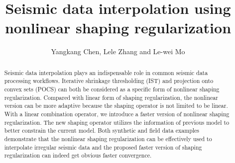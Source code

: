\title{Seismic data interpolation using nonlinear shaping regularization}

\renewcommand{\thefootnote}{\fnsymbol{footnote}}
\author{Yangkang Chen\footnotemark[1], Lele Zhang \footnotemark[2] and Le-wei Mo \footnotemark[3]}

\address{
\footnotemark[1]Bureau of Economic Geology \\
John A. and Katherine G. Jackson School of Geosciences \\
The University of Texas at Austin \\
University Station, Box X \\
Austin, TX 78713-8924 \\

\footnotemark[2]
Institute of Geology and Geophysics, \\
Chinese Academy of Sciences,\\
Beijing, China, 102200 \\

\footnotemark[3]Research and Development Technology Group,
Fairfield Nodal, \\
1111 Gillingham Lane, \\
Sugar Land, TX 77478 \\
}


\maketitle

\begin{abstract}
Seismic data interpolation plays an indispensable role in common seismic data processing workflows. Iterative shrinkage thresholding (IST) and projection onto convex sets (POCS) can both be considered as a specific form of nonlinear shaping regularization. Compared with linear form of shaping regularization, the nonlinear version can be more adaptive because the shaping operator is not limited to be linear. With a linear combination operator, we introduce a faster version of nonlinear shaping regularization. The new shaping operator utilizes the information of previous model to better constrain the current model. Both synthetic and field data examples demonstrate that the nonlinear shaping regularization can be effectively used to interpolate irregular seismic data and the proposed faster version of shaping regularization can indeed get obvious faster convergence.
\end{abstract}

